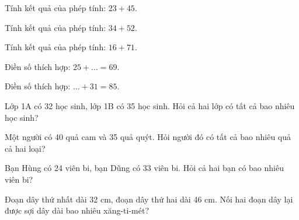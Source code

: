 \begin{ex}
Tính kết quả của phép tính: $23 + 45$.
\end{ex}

\begin{ex}
Tính kết quả của phép tính: $34 + 52$.
\end{ex}

\begin{ex}
Tính kết quả của phép tính: $16 + 71$.
\end{ex}

\begin{ex}
Điền số thích hợp: $25 + \dots = 69$.
\end{ex}

\begin{ex}
Điền số thích hợp: $\dots + 31 = 85$.
\end{ex}

\begin{ex}
Lớp 1A có 32 học sinh, lớp 1B có 35 học sinh. Hỏi cả hai lớp có tất cả bao nhiêu học sinh?
\end{ex}

\begin{ex}
Một người có 40 quả cam và 35 quả quýt. Hỏi người đó có tất cả bao nhiêu quả cả hai loại?
\end{ex}

\begin{ex}
Bạn Hùng có 24 viên bi, bạn Dũng có 33 viên bi. Hỏi cả hai bạn có bao nhiêu viên bi?
\end{ex}

\begin{ex}
Đoạn dây thứ nhất dài 32 cm, đoạn dây thứ hai dài 46 cm. Nối hai đoạn dây lại được sợi dây dài bao nhiêu xăng-ti-mét?
\end{ex}

